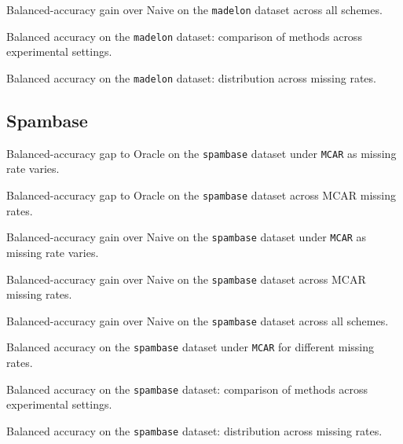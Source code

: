 \documentclass[8pt,a4paper]{extarticle}
\begin{document}
{Balanced-accuracy gain over Naive on the \texttt{madelon} dataset across all schemes.}

{Balanced accuracy on the \texttt{madelon} dataset: comparison of methods across experimental settings.}

{Balanced accuracy on the \texttt{madelon} dataset: distribution across missing rates.}

\clearpage
\subsection{Spambase}

{Balanced-accuracy gap to Oracle on the \texttt{spambase} dataset under \texttt{MCAR} as missing rate varies.}

{Balanced-accuracy gap to Oracle on the \texttt{spambase} dataset across MCAR missing rates.}

{Balanced-accuracy gain over Naive on the \texttt{spambase} dataset under \texttt{MCAR} as missing rate varies.}

{Balanced-accuracy gain over Naive on the \texttt{spambase} dataset across MCAR missing rates.}

{Balanced-accuracy gain over Naive on the \texttt{spambase} dataset across all schemes.}

{Balanced accuracy on the \texttt{spambase} dataset under \texttt{MCAR} for different missing rates.}

{Balanced accuracy on the \texttt{spambase} dataset: comparison of methods across experimental settings.}

{Balanced accuracy on the \texttt{spambase} dataset: distribution across missing rates.}
\end{document}
